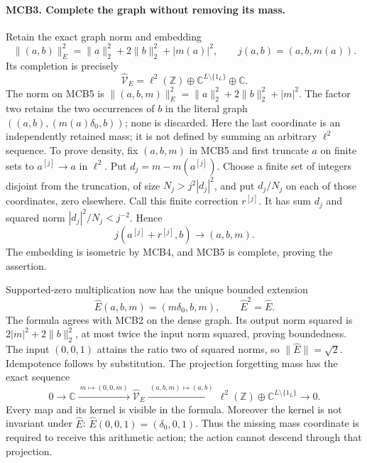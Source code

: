 \paragraph{MCB3. Complete the graph without removing its mass.}
Retain the exact graph norm and embedding
\[
 \|(a,b)\|_E^2=\|a\|_2^2+2\|b\|_2^2+|m(a)|^2,
 \qquad j(a,b)=(a,b,m(a)).                        \tag{MCB4}
\]
Its completion is precisely
\[
 \widehat{\mathcal V}_E=
 \ell^2(\mathbb Z)\oplus\mathbb C^{L\setminus\{1_L\}}
                              \oplus\mathbb C.    \tag{MCB5}
\]
The norm on MCB5 is
\(\|(a,b,m)\|_E^2=\|a\|_2^2+2\|b\|_2^2+|m|^2\).
The factor two retains the two occurrences of \(b\) in the
literal graph \(((a,b),(m(a)\delta_0,b))\); none is discarded.
Here the last coordinate is an independently retained mass; it
is not defined by summing an arbitrary \(\ell^2\) sequence.
To prove density, fix \((a,b,m)\) in MCB5 and first truncate
\(a\) on finite sets to \(a^{[j]}\to a\) in \(\ell^2\).
Put \(d_j=m-m(a^{[j]})\). Choose a finite set of integers
disjoint from the truncation, of size \(N_j>j^2|d_j|^2\),
and put \(d_j/N_j\) on each of those coordinates, zero elsewhere.
Call this finite correction \(r^{[j]}\). It has sum \(d_j\)
and squared norm \(|d_j|^2/N_j<j^{-2}\). Hence
\[
 j(a^{[j]}+r^{[j]},b)\longrightarrow(a,b,m).
                                                               \tag{MCB6}
\]
The embedding is isometric by MCB4, and MCB5 is complete,
proving the assertion.

Supported-zero multiplication now has the unique bounded extension
\[
 \widehat E(a,b,m)=(m\delta_0,b,m),\qquad
 \widehat E^2=\widehat E .                         \tag{MCB7}
\]
The formula agrees with MCB2 on the dense graph. Its output norm
squared is \(2|m|^2+2\|b\|_2^2\), at most twice the input norm
squared, proving boundedness. The input \((0,0,1)\) attains
the ratio two of squared norms, so \(\|\widehat E\|=\sqrt2\).
Idempotence follows by substitution.
The projection forgetting mass has the exact sequence
\[
 0\longrightarrow\mathbb C
 \xrightarrow{\ m\mapsto(0,0,m)\ }
 \widehat{\mathcal V}_E
 \xrightarrow{\ (a,b,m)\mapsto(a,b)\ }
 \ell^2(\mathbb Z)\oplus\mathbb C^{L\setminus\{1_L\}}
 \longrightarrow0 .                              \tag{MCB8}
\]
Every map and its kernel is visible in the formula. Moreover the
kernel is not invariant under \(\widehat E\):
\(\widehat E(0,0,1)=(\delta_0,0,1)\).
Thus the missing mass coordinate is required to receive this
arithmetic action; the action cannot descend through that projection.

